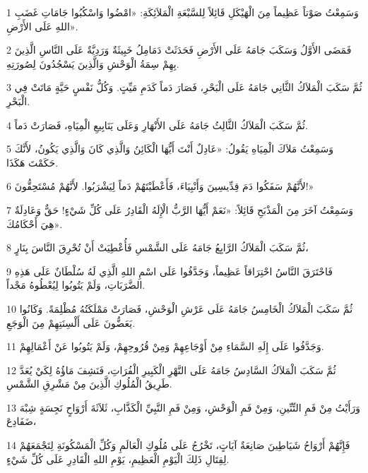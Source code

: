 \par 1 وَسَمِعْتُ صَوْتاً عَظِيماً مِنَ الْهَيْكَلِ قَائِلاً لِلسَّبْعَةِ الْمَلاَئِكَةِ: «امْضُوا وَاسْكُبُوا جَامَاتِ غَضَبِ اللهِ عَلَى الأَرْضِ».
\par 2 فَمَضَى الأَوَّلُ وَسَكَبَ جَامَهُ عَلَى الأَرْضِ فَحَدَثَتْ دَمَامِلُ خَبِيثَةٌ وَرَدِيَّةٌ عَلَى النَّاسِ الَّذِينَ بِهِمْ سِمَةُ الْوَحْشِ وَالَّذِينَ يَسْجُدُونَ لِصُورَتِهِ.
\par 3 ثُمَّ سَكَبَ الْمَلاَكُ الثَّانِي جَامَهُ عَلَى الْبَحْرِ، فَصَارَ دَماً كَدَمِ مَيِّتٍ. وَكُلُّ نَفْسٍ حَيَّةٍ مَاتَتْ فِي الْبَحْرِ.
\par 4 ثُمَّ سَكَبَ الْمَلاَكُ الثَّالِثُ جَامَهُ عَلَى الأَنْهَارِ وَعَلَى يَنَابِيعِ الْمِيَاهِ، فَصَارَتْ دَماً.
\par 5 وَسَمِعْتُ مَلاَكَ الْمِيَاهِ يَقُولُ: «عَادِلٌ أَنْتَ أَيُّهَا الْكَائِنُ وَالَّذِي كَانَ وَالَّذِي يَكُونُ، لأَنَّكَ حَكَمْتَ هَكَذَا.
\par 6 لأَنَّهُمْ سَفَكُوا دَمَ قِدِّيسِينَ وَأَنْبِيَاءَ، فَأَعْطَيْتَهُمْ دَماً لِيَشْرَبُوا. لأَنَّهُمْ مُسْتَحِقُّونَ!»
\par 7 وَسَمِعْتُ آخَرَ مِنَ الْمَذْبَحِ قَائِلاً: «نَعَمْ أَيُّهَا الرَّبُّ الْإِلَهُ الْقَادِرُ عَلَى كُلِّ شَيْءٍ! حَقٌّ وَعَادِلَةٌ هِيَ أَحْكَامُكَ».
\par 8 ثُمَّ سَكَبَ الْمَلاَكُ الرَّابِعُ جَامَهُ عَلَى الشَّمْسِ فَأُعْطِيَتْ أَنْ تُحْرِقَ النَّاسَ بِنَارٍ،
\par 9 فَاحْتَرَقَ النَّاسُ احْتِرَاقاً عَظِيماً، وَجَدَّفُوا عَلَى اسْمِ اللهِ الَّذِي لَهُ سُلْطَانٌ عَلَى هَذِهِ الضَّرَبَاتِ، وَلَمْ يَتُوبُوا لِيُعْطُوهُ مَجْداً.
\par 10 ثُمَّ سَكَبَ الْمَلاَكُ الْخَامِسُ جَامَهُ عَلَى عَرْشِ الْوَحْشِ، فَصَارَتْ مَمْلَكَتُهُ مُظْلِمَةً. وَكَانُوا يَعَضُّونَ عَلَى أَلْسِنَتِهِمْ مِنَ الْوَجَعِ.
\par 11 وَجَدَّفُوا عَلَى إِلَهِ السَّمَاءِ مِنْ أَوْجَاعِهِمْ وَمِنْ قُرُوحِهِمْ، وَلَمْ يَتُوبُوا عَنْ أَعْمَالِهِمْ.
\par 12 ثُمَّ سَكَبَ الْمَلاَكُ السَّادِسُ جَامَهُ عَلَى النَّهْرِ الْكَبِيرِ الْفُرَاتِ، فَنَشِفَ مَاؤُهُ لِكَيْ يُعَدَّ طَرِيقُ الْمُلُوكِ الَّذِينَ مِنْ مَشْرِقِ الشَّمْسِ.
\par 13 وَرَأَيْتُ مِنْ فَمِ التِّنِّينِ، وَمِنْ فَمِ الْوَحْشِ، وَمِنْ فَمِ النَّبِيِّ الْكَذَّابِ، ثَلاَثَةَ أَرْوَاحٍ نَجِسَةٍ شِبْهَ ضَفَادِعَ،
\par 14 فَإِنَّهُمْ أَرْوَاحُ شَيَاطِينَ صَانِعَةٌ آيَاتٍ، تَخْرُجُ عَلَى مُلُوكِ الْعَالَمِ وَكُلِّ الْمَسْكُونَةِ لِتَجْمَعَهُمْ لِقِتَالِ ذَلِكَ الْيَوْمِ الْعَظِيمِ، يَوْمِ اللهِ الْقَادِرِ عَلَى كُلِّ شَيْءٍ.
